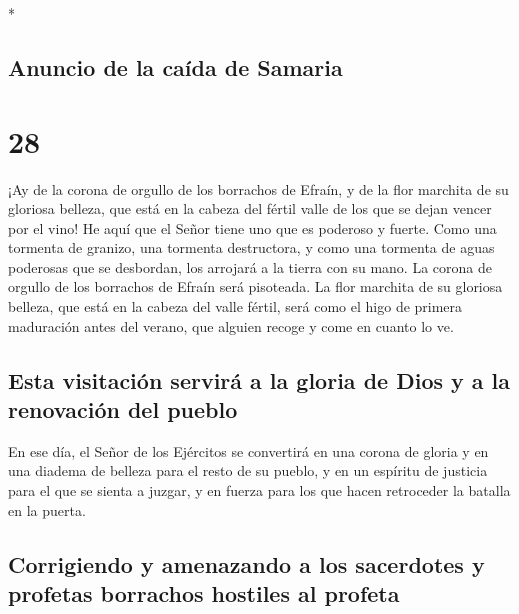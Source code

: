 \begin{paracol}{2}
\begin{otherlanguage}{english}
\end{otherlanguage}

\switchcolumn[0]*

\hypertarget{anuncio-de-la-cauxedda-de-samaria}{%
\subsection{Anuncio de la caída de
Samaria}\label{anuncio-de-la-cauxedda-de-samaria}}

\hypertarget{section-54}{%
\section{28}\label{section-54}}

 ¡Ay de la corona de orgullo de los borrachos de Efraín, y
de la flor marchita de su gloriosa belleza, que está en la cabeza del
fértil valle de los que se dejan vencer por el vino!  He
aquí que el Señor tiene uno que es poderoso y fuerte. Como una tormenta
de granizo, una tormenta destructora, y como una tormenta de aguas
poderosas que se desbordan, los arrojará a la tierra con su mano.
 La corona de orgullo de los borrachos de Efraín será
pisoteada.  La flor marchita de su gloriosa belleza, que
está en la cabeza del valle fértil, será como el higo de primera
maduración antes del verano, que alguien recoge y come en cuanto lo ve.

\hypertarget{esta-visitaciuxf3n-serviruxe1-a-la-gloria-de-dios-y-a-la-renovaciuxf3n-del-pueblo}{%
\subsection{Esta visitación servirá a la gloria de Dios y a la
renovación del
pueblo}\label{esta-visitaciuxf3n-serviruxe1-a-la-gloria-de-dios-y-a-la-renovaciuxf3n-del-pueblo}}

 En ese día, el Señor de los Ejércitos se convertirá en
una corona de gloria y en una diadema de belleza para el resto de su
pueblo,  y en un espíritu de justicia para el que se
sienta a juzgar, y en fuerza para los que hacen retroceder la batalla en
la puerta.

\hypertarget{corrigiendo-y-amenazando-a-los-sacerdotes-y-profetas-borrachos-hostiles-al-profeta}{%
\subsection{Corrigiendo y amenazando a los sacerdotes y profetas
borrachos hostiles al
profeta}\label{corrigiendo-y-amenazando-a-los-sacerdotes-y-profetas-borrachos-hostiles-al-profeta}}


\end{paracol}
